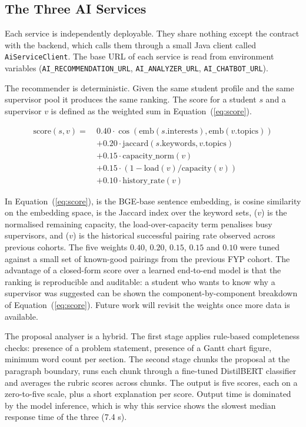 \documentclass[conference,a4paper]{IEEEtran}
\begin{document}
\subsection{The Three AI Services}
Each service is independently deployable. They share nothing except the contract with the backend, which calls them through a small Java client called \texttt{AiServiceClient}. The base URL of each service is read from environment variables (\texttt{AI\_RECOMMENDATION\_URL}, \texttt{AI\_ANALYZER\_URL}, \texttt{AI\_CHATBOT\_URL}).

The recommender is deterministic. Given the same student profile and the same supervisor pool it produces the same ranking. The score for a student $s$ and a supervisor $v$ is defined as the weighted sum in Equation~(\ref{eq:score}).

\begin{equation}
\begin{aligned}
\text{score}(s, v) =\ &0.40 \cdot \cos(\text{emb}(s.\text{interests}), \text{emb}(v.\text{topics})) \\
&+ 0.20 \cdot \text{jaccard}(s.\text{keywords}, v.\text{topics}) \\
&+ 0.15 \cdot \text{capacity\_norm}(v) \\
&+ 0.15 \cdot (1 - \text{load}(v)/\text{capacity}(v)) \\
&+ 0.10 \cdot \text{history\_rate}(v)
\end{aligned}
\label{eq:score}
\end{equation}

In Equation~(\ref{eq:score}),  is the BGE-base sentence embedding,  is cosine similarity on the embedding space,  is the Jaccard index over the keyword sets, ($v$) is the normalised remaining capacity, the load-over-capacity term penalises busy supervisors, and ($v$) is the historical successful pairing rate observed across previous cohorts. The five weights $0.40$, $0.20$, $0.15$, $0.15$ and $0.10$ were tuned against a small set of known-good pairings from the previous FYP cohort. The advantage of a closed-form score over a learned end-to-end model is that the ranking is reproducible and auditable: a student who wants to know why a supervisor was suggested can be shown the component-by-component breakdown of Equation~(\ref{eq:score}). Future work will revisit the weights once more data is available.

The proposal analyser is a hybrid. The first stage applies rule-based completeness checks: presence of a problem statement, presence of a Gantt chart figure, minimum word count per section. The second stage chunks the proposal at the paragraph boundary, runs each chunk through a fine-tuned DistilBERT \cite{sanh2019} classifier and averages the rubric scores across chunks. The output is five scores, each on a zero-to-five scale, plus a short explanation per score. Output time is dominated by the model inference, which is why this service shows the slowest median response time of the three (7.4 s).
\end{document}
